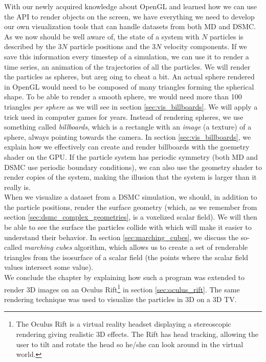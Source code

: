 With our newly acquired knowledge about OpenGL and learned how we can use the API to render objects on the screen, we have everything we need to develop our own visualization tools that can handle datasets from both MD and DSMC. As we now should be well aware of, the state of a system with $N$ particles is described by the $3N$ particle positions and the $3N$ velocity components. If we save this information every timestep of a simulation, we can use it to render a time series, an animation of the trajectories of all the particles. We will render the particles as spheres, but areg oing to cheat a bit. An actual sphere rendered in OpenGL would need to be composed of many triangles forming the spherical shape. To be able to render a smooth sphere, we would need more than 100 triangles \textit{per sphere} as we will see in section \ref{sec:vis_billboards}. We will apply a trick used in computer games for years. Instead of rendering spheres, we use something called \textit{billboards}, which is a rectangle with an \textit{image} (a texture) of a sphere, always pointing towards the camera. In section \ref{sec:vis_billboards}, we explain how we effectively can create and render billboards with the goemetry shader on the GPU. If the particle system has periodic symmetry (both MD and DSMC use periodic boundary conditions), we can also use the geometry shader to render copies of the system, making the illusion that the system is larger than it really is.\\
When we visualize a dataset from a DSMC simulation, we should, in addition to the particle positions, render the surface geometry (which, as we remember from section \ref{sec:dsmc_complex_geometries}, is a voxelized scalar field). We will then be able to see the surface the particles collide with which will make it easier to understand their behavior. In section \ref{sec:marching_cubes}, we discuss the so-called \textit{marching cubes} algorithm, which allows us to create a set of renderable triangles from the isosurface of a scalar field (the points where the scalar field values intersect some value).\\
We conclude the chapter by explaining how such a program was extended to render 3D images on an Oculus Rift\footnote{The Oculus Rift is a virtual reality headset displaying a stereoscopic rendering giving realistic 3D effects. The Rift has head tracking, allowing the user to tilt and rotate the head so he/she can look around in the virtual world.} in section \ref{sec:oculus_rift}. The same rendering technique was used to visualize the particles in 3D on a 3D TV.